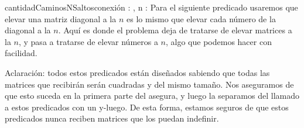 \documentclass[10pt,a4paper]{article}
\begin{document}
\begin{proc}{cantidadCaminosNSaltos}{\Inout conexi\'on : \TLista{\TLista{\ent}}, \In n : \ent}{}
		\vspace{0.3cm}
		Para el siguiente predicado usaremos que elevar una matriz diagonal a la $n$ es lo mismo que elevar cada n\'umero 
		de la diagonal a la $n$. Aqu\'i es donde el problema deja de tratarse de elevar matrices a la $n$, y pasa a 
		tratarse de elevar n\'umeros a $n$, algo que podemos hacer con facilidad.
		
		{}
		
		{}
		
		{}
		
		\vspace{0.3cm}
		Aclaraci\'on: todos estos predicados est\'an diseñados sabiendo que todas las matrices que recibirán serán cuadradas y del mismo tamaño.
		Nos aseguramos de que esto suceda en la primera parte del asegura, y luego la separamos del llamado a estos predicados con un y-luego. De esta forma, estamos seguros de que 
		estos predicados nunca reciben matrices que los puedan indefinir.
	\end{proc}
\end{document}
